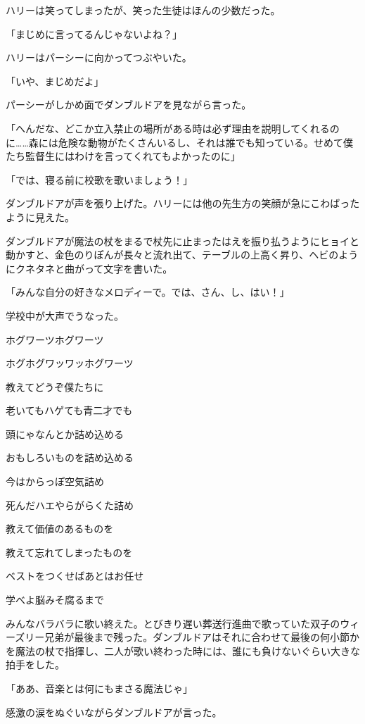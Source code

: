\documentclass[10pt,a4paper]{article}
\begin{document}
\begin{CJK}{UTF8}{min}
ハリーは笑ってしまったが、笑った生徒はほんの少数だった。

「まじめに言ってるんじゃないよね？」

ハリーはパーシーに向かってつぶやいた。

「いや、まじめだよ」

パーシーがしかめ面でダンブルドアを見ながら言った。

「へんだな、どこか立入禁止の場所がある時は必ず理由を説明してくれるのに……森には危険な動物がたくさんいるし、それは誰でも知っている。せめて僕たち監督生にはわけを言ってくれてもよかったのに」

「では、寝る前に校歌を歌いましょう！」

ダンブルドアが声を張り上げた。ハリーには他の先生方の笑顔が急にこわばったように見えた。

ダンブルドアが魔法の杖をまるで杖先に止まったはえを振り払うようにヒョイと動かすと、金色のりぽんが長々と流れ出て、テーブルの上高く昇り、ヘビのようにクネタネと曲がって文字を書いた。

「みんな自分の好きなメロディーで。では、さん、し、はい！」

学校中が大声でうなった。





ホグワーツホグワーツ

ホグホグワッワッホグワーツ

教えてどうぞ僕たちに

老いてもハゲても青二才でも

頭にゃなんとか詰め込める

おもしろいものを詰め込める

今はからっぽ空気詰め

死んだハエやらがらくた詰め

教えて価値のあるものを

教えて忘れてしまったものを

ベストをつくせばあとはお任せ

学べよ脳みそ腐るまで





みんなバラバラに歌い終えた。とびきり遅い葬送行進曲で歌っていた双子のウィーズリー兄弟が最後まで残った。ダンブルドアはそれに合わせて最後の何小節かを魔法の杖で指揮し、二人が歌い終わった時には、誰にも負けないぐらい大きな拍手をした。

「ああ、音楽とは何にもまさる魔法じゃ」

感激の涙をぬぐいながらダンブルドアが言った。


\end{CJK}
\end{document}
